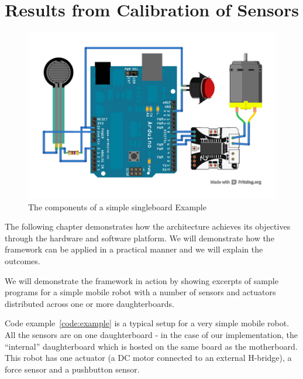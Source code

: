 \section{Results from Calibration of Sensors}




\begin{figure}
  \begin{center}
    \includegraphics[width=1.0\columnwidth]{Figures/simple-example.pdf}
    \caption{The components of a simple singleboard \xten Example}
  \end{center}
\end{figure}

The following chapter demonstrates how the \xten architecture achieves its objectives through the hardware and software platform. We will demonstrate how the framework can be applied in a practical manner and we will explain the outcomes.

 We will demonstrate the framework in action by showing excerpts of sample programs for a simple mobile robot with a number of sensors and actuators distributed across one or more daughterboards.


Code example~\ref{code:example} is a typical setup for a very simple mobile robot. All the sensors are on one daughterboard - in the case of our implementation, the ``internal'' daughterboard which is hosted on the same board as the motherboard. This robot has one actuator (a DC motor connected to an external H-bridge), a force sensor and a pushbutton sensor.


